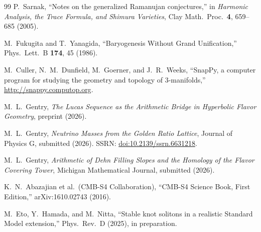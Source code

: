 ﻿\documentclass[12pt]{article}
\theoremstyle{definition}
\begin{document}
\begin{thebibliography}{99}
  P.~Sarnak,
  ``Notes on the generalized Ramanujan conjectures,''
  in \emph{Harmonic Analysis, the Trace Formula, and Shimura Varieties},
  Clay Math.\ Proc.\ \textbf{4}, 659--685 (2005).

  M.~Fukugita and T.~Yanagida,
  ``Baryogenesis Without Grand Unification,''
  Phys.\ Lett.\ B \textbf{174}, 45 (1986).

  M.~Culler, N.~M.~Dunfield, M.~Goerner, and J.~R.~Weeks,
  ``SnapPy, a computer program for studying the geometry and topology of 3-manifolds,''
  \url{http://snappy.computop.org}.

M.~L.~Gentry,
\textit{The Lucas Sequence as the Arithmetic Bridge in Hyperbolic Flavor Geometry},
preprint (2026).

M.~L.~Gentry,
\textit{Neutrino Masses from the Golden Ratio Lattice},
Journal of Physics G, submitted (2026). SSRN: \href{https://doi.org/10.2139/ssrn.6631218}{doi:10.2139/ssrn.6631218}.

M.~L.~Gentry,
\textit{Arithmetic of Dehn Filling Slopes and the Homology of the Flavor Covering Tower},
Michigan Mathematical Journal, submitted (2026).


  K.~N.~Abazajian et al.\ (CMB-S4 Collaboration),
  ``CMB-S4 Science Book, First Edition,''
  arXiv:1610.02743 (2016).

  M.~Eto, Y.~Hamada, and M.~Nitta,
  ``Stable knot solitons in a realistic Standard Model extension,''
  Phys.\ Rev.\ D (2025), in preparation.

\end{thebibliography}
\end{document}
